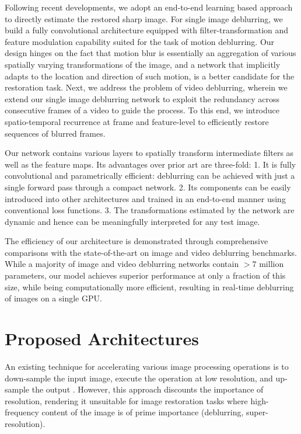 \documentclass[10pt,twocolumn,letterpaper]{article}
\begin{document}
Following recent developments, we adopt an end-to-end learning based approach to directly estimate the restored sharp image. For single image deblurring, we build a fully convolutional architecture equipped with filter-transformation and feature modulation capability suited for the task of motion deblurring. Our design hinges on the fact that motion blur is essentially an aggregation of various spatially varying transformations of the image, and a network that implicitly adapts to the location and direction of such motion, is a better candidate for the restoration task. Next, we address the problem of video deblurring, wherein we extend our single image deblurring network to exploit the redundancy across consecutive frames of a video to guide the process. To this end, we introduce spatio-temporal recurrence at frame and feature-level to efficiently restore sequences of blurred frames.



Our network contains various layers to spatially transform intermediate filters as well as the feature maps. Its advantages over prior art are three-fold: 1. It is fully convolutional and parametrically efficient: deblurring can be achieved with just a single forward pass through a compact network. 2. Its components can be easily introduced into other architectures and trained in an end-to-end manner using conventional loss functions. 3. The transformations estimated by the network are dynamic and hence can be meaningfully interpreted for any test image. 


The efficiency of our architecture is demonstrated through comprehensive comparisons with the state-of-the-art on image and video deblurring benchmarks. While a majority of image and video deblurring networks contain $>7$ million parameters, our model achieves superior performance at only a fraction of this size, while being computationally more efficient, resulting in real-time deblurring of images on a single GPU.\\

\section{Proposed Architectures}

An existing technique for accelerating various image processing operations is to down-sample the input image, execute the operation at low resolution, and up-sample the output \cite{chen2016bilateral}. However, this approach discounts the importance of resolution, rendering it unsuitable for image restoration tasks where high-frequency content of the image is of prime importance (deblurring, super-resolution).
\end{document}
